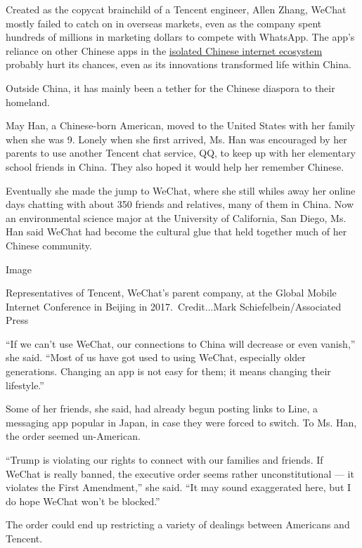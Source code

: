 Created as the copycat brainchild of a Tencent engineer, Allen Zhang,
WeChat mostly failed to catch on in overseas markets, even as the
company spent hundreds of millions in marketing dollars to compete with
WhatsApp. The app's reliance on other Chinese apps in the
\href{https://www.nytimes3xbfgragh.onion/2016/08/10/technology/china-homegrown-internet-companies-rest-of-the-world.html}{isolated
Chinese internet ecosystem} probably hurt its chances, even as its
innovations transformed life within China.

Outside China, it has mainly been a tether for the Chinese diaspora to
their homeland.

May Han, a Chinese-born American, moved to the United States with her
family when she was 9. Lonely when she first arrived, Ms. Han was
encouraged by her parents to use another Tencent chat service, QQ, to
keep up with her elementary school friends in China. They also hoped it
would help her remember Chinese.

Eventually she made the jump to WeChat, where she still whiles away her
online days chatting with about 350 friends and relatives, many of them
in China. Now an environmental science major at the University of
California, San Diego, Ms. Han said WeChat had become the cultural glue
that held together much of her Chinese community.

Image

Representatives of Tencent, WeChat's parent company, at the Global
Mobile Internet Conference in Beijing in 2017.~Credit...Mark
Schiefelbein/Associated Press

``If we can't use WeChat, our connections to China will decrease or even
vanish,'' she said. ``Most of us have got used to using WeChat,
especially older generations. Changing an app is not easy for them; it
means changing their lifestyle.''

Some of her friends, she said, had already begun posting links to Line,
a messaging app popular in Japan, in case they were forced to switch. To
Ms. Han, the order seemed un-American.

``Trump is violating our rights to connect with our families and
friends. If WeChat is really banned, the executive order seems rather
unconstitutional --- it violates the First Amendment,'' she said. ``It
may sound exaggerated here, but I do hope WeChat won't be blocked.''

The order could end up restricting a variety of dealings between
Americans and Tencent.

